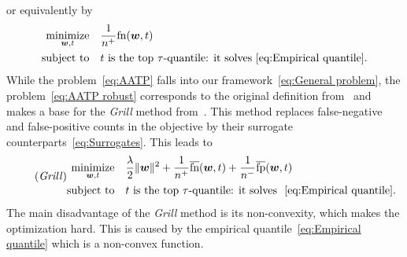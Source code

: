 \documentclass[11pt,a4paper]{article}
\theoremstyle{definition}
\newcommand{\norm}[1]{\|#1\|}
\newcommand{\minimize}{\operatorname*{minimize}}
\newcommand{\st}{\operatorname{subject\ to}}
\newcommand{\fn}{\textnormal{fn}}
\newcommand{\fps}{\overline{\textnormal{fp}}}
\newcommand{\fns}{\overline{\textnormal{fn}}}
\newcommand{\grill}{\textit{Grill}\xspace}
\begin{document}
or equivalently by
\begin{equation}\label{eq:AATP}
  \begin{aligned}
    \minimize_{\bm{w}, t} & \quad \frac{1}{n^+}\fn(\bm{w},t)\\
    \st                   & \quad t \text{ is the top \ensuremath{\tau}-quantile: it solves }\eqref{eq:Empirical quantile}.
  \end{aligned}
\end{equation}
While the problem~\eqref{eq:AATP} falls into our framework~\eqref{eq:General problem}, the problem~\eqref{eq:AATP robust} corresponds to the original definition from~\cite{boyd2012accuracy} and makes a base for the \grill method from~\cite{grill2016learning}. This method replaces false-negative and false-positive counts in the objective by their surrogate counterparts~\eqref{eq:Surrogates}. This leads to
\begin{equation}\label{eq:Grill}\tag{\grill}
  \begin{aligned}
    \minimize_{\bm{w}, t} & \quad \frac{\lambda}{2}\norm{\bm{w}}^2 + \frac{1}{n^+}\fns(\bm{w},t) + \frac{1}{n^-}\fps(\bm{w},t) \\
    \st                   & \quad t \text{ is the top \ensuremath{\tau}-quantile: it solves }~\eqref{eq:Empirical quantile}.
  \end{aligned}
\end{equation}
The main disadvantage of the \grill method is its non-convexity, which makes the optimization hard. This is caused by the empirical quantile~\eqref{eq:Empirical quantile} which is a non-convex function.
\end{document}
